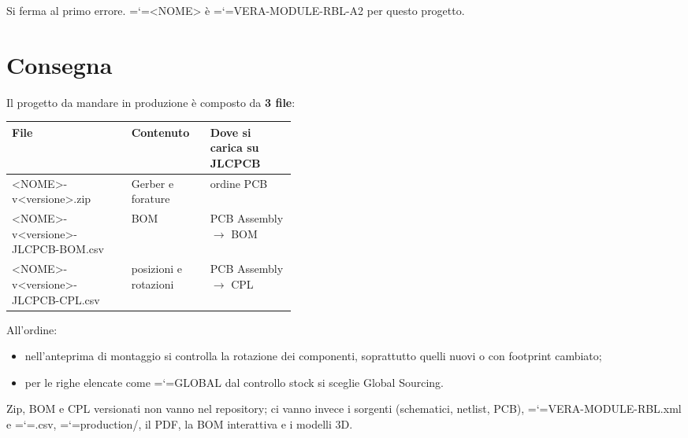 \documentclass[11pt,a4paper]{article}
\makeatletter
\newcommand{\projname}{VERA-MODULE-RBL-A2}
\newcommand{\file}[1]{{\ttfamily\hyphenchar\font=`\-\relax\language=\l@nohyphenation #1}}
\makeatother
\begin{document}
Si ferma al primo errore. \file{<NOME>} è \file{\projname} per questo progetto.

\section{Consegna}

Il progetto da mandare in produzione è composto da \textbf{3 file}:

\begin{center}
\begin{tabularx}{\linewidth}{>{\raggedright\arraybackslash\ttfamily\small}p{0.42\linewidth} L L}
\toprule
\normalfont\normalsize\textbf{File} & \textbf{Contenuto} & \textbf{Dove si carica su JLCPCB} \\
\midrule
<NOME>-v<versione>.zip             & Gerber e forature     & ordine PCB \\
<NOME>-v<versione>-JLCPCB-BOM.csv  & BOM                   & PCB Assembly $\rightarrow$ BOM \\
<NOME>-v<versione>-JLCPCB-CPL.csv  & posizioni e rotazioni & PCB Assembly $\rightarrow$ CPL \\
\bottomrule
\end{tabularx}
\end{center}

All'ordine:

\begin{itemize}[leftmargin=*]
  \item nell'anteprima di montaggio si controlla la rotazione dei componenti,
        soprattutto quelli nuovi o con footprint cambiato;
  \item per le righe elencate come \file{GLOBAL} dal controllo stock si sceglie
        Global Sourcing.
\end{itemize}

Zip, BOM e CPL versionati non vanno nel repository; ci vanno invece i sorgenti
(schematici, netlist, PCB), \file{VERA-MODULE-RBL.xml} e \file{.csv},
\file{production/}, il PDF, la BOM interattiva e i modelli 3D.
\end{document}
